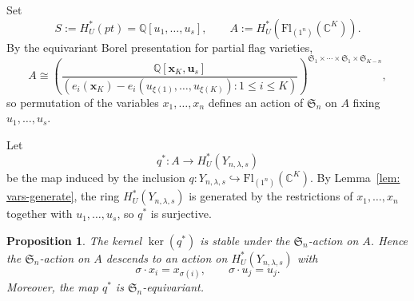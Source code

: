 \documentclass[11pt]{amsart}
\numberwithin{equation}{section}
\newtheorem{proposition}[theorem]{Proposition}
\theoremstyle{definition}
\newcommand{\symm}{{\mathfrak{S}}}
\newcommand{\CC}{{\mathbb{C}}}
\newcommand{\QQ}{{\mathbb{Q}}}
\newcommand{\xxx}{{\mathbf{x}}}
\newcommand{\uuu}{{\mathbf{u}}}
\newcommand{\Fl}{\text{Fl}}
\begin{document}
Set
\[
S:=H_U^*(pt)=\QQ[u_1,\dots,u_s],
\qquad
A:=H_U^*(\Fl_{(1^n)}(\CC^K)).
\]
By the equivariant Borel presentation for partial flag varieties,
\[
A\cong
\left(
\frac{\QQ[\xxx_K,\uuu_s]}{(e_i(\xxx_K)-e_i(u_{\xi(1)},\dots,u_{\xi(K)}):1\leq i\leq K)}
\right)^{\symm_1\times\cdots\times \symm_1\times \symm_{K-n}},
\]
so permutation of the variables $x_1,\dots,x_n$ defines an action of $\symm_n$
on $A$ fixing $u_1,\dots,u_s$.

Let
\[
q^*:A\to H_U^*(Y_{n,\lambda,s})
\]
be the map induced by the inclusion
$q:Y_{n,\lambda,s}\hookrightarrow \Fl_{(1^n)}(\CC^K)$. By
Lemma~\ref{lem: vars-generate}, the ring $H_U^*(Y_{n,\lambda,s})$ is generated
by the restrictions of $x_1,\dots,x_n$ together with $u_1,\dots,u_s$, so $q^*$
is surjective.

\begin{proposition}\label{prop:Sn-action-equiv}
The kernel $\ker(q^*)$ is stable under the $\symm_n$-action on $A$. Hence the
$\symm_n$-action on $A$ descends to an action on $H_U^*(Y_{n,\lambda,s})$ with
\[
\sigma\cdot x_i=x_{\sigma(i)},\qquad \sigma\cdot u_j=u_j.
\]
Moreover, the map $q^*$ is $\symm_n$-equivariant.
\end{proposition}
\end{document}
